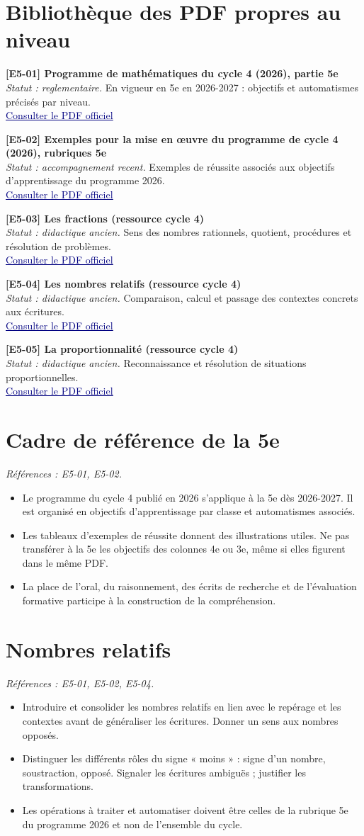 \documentclass[11pt,a4paper]{article}
\newcommand{\refsource}[1]{\textsf{\textcolor{slate}{[#1]}}}
\newcommand{\sectionref}[2]{\section{#1}\textit{Références : #2.}\par}
\newcommand{\entreesource}[5]{\par\noindent\textbf{\refsource{#1} #2}\\[-2pt]\textit{Statut : #3.} #4\\[-2pt]\href{#5}{\textcolor{navy}{\underline{Consulter le PDF officiel}}}\par\smallskip}
\begin{document}
\section{Bibliothèque des PDF propres au niveau}
\entreesource{E5-01}{Programme de mathématiques du cycle 4 (2026), partie 5e}{reglementaire}{En vigueur en 5e en 2026-2027 : objectifs et automatismes précisés par niveau.}{https://www.education.gouv.fr/sites/default/files/document/Annexe\%202\%20\%E2\%80\%93\%20Programme\%20de\%20math\%C3\%A9matiques\%20pour\%20le\%20cycle\%204-480716.pdf}
\entreesource{E5-02}{Exemples pour la mise en œuvre du programme de cycle 4 (2026), rubriques 5e}{accompagnement recent}{Exemples de réussite associés aux objectifs d’apprentissage du programme 2026.}{https://eduscol.education.gouv.fr/media/126080/download?attachment=}
\entreesource{E5-03}{Les fractions (ressource cycle 4)}{didactique ancien}{Sens des nombres rationnels, quotient, procédures et résolution de problèmes.}{https://eduscol.education.gouv.fr/sites/default/files/document/ra16c4mathfractionsdocmaitrecomp-calresoudre554225pdf-77607.pdf}
\entreesource{E5-04}{Les nombres relatifs (ressource cycle 4)}{didactique ancien}{Comparaison, calcul et passage des contextes concrets aux écritures.}{https://eduscol.education.gouv.fr/sites/default/files/document/ra16c4mathdocmaitrenombresrelatifscomparercalculerresoudrend552028pdf-77613.pdf}
\entreesource{E5-05}{La proportionnalité (ressource cycle 4)}{didactique ancien}{Reconnaissance et résolution de situations proportionnelles.}{https://eduscol.education.gouv.fr/sites/default/files/document/ra16c4mathresoupropo555092pdf-77649.pdf}
\sectionref{Cadre de référence de la 5e}{E5-01, E5-02}
\begin{itemize}
\item Le programme du cycle 4 publié en 2026 s’applique à la 5e dès 2026-2027. Il est organisé en objectifs d’apprentissage par classe et automatismes associés.
\item Les tableaux d’exemples de réussite donnent des illustrations utiles. Ne pas transférer à la 5e les objectifs des colonnes 4e ou 3e, même si elles figurent dans le même PDF.
\item La place de l’oral, du raisonnement, des écrits de recherche et de l’évaluation formative participe à la construction de la compréhension.
\end{itemize}
\sectionref{Nombres relatifs}{E5-01, E5-02, E5-04}
\begin{itemize}
\item Introduire et consolider les nombres relatifs en lien avec le repérage et les contextes avant de généraliser les écritures. Donner un sens aux nombres opposés.
\item Distinguer les différents rôles du signe « moins » : signe d’un nombre, soustraction, opposé. Signaler les écritures ambiguës ; justifier les transformations.
\item Les opérations à traiter et automatiser doivent être celles de la rubrique 5e du programme 2026 et non de l’ensemble du cycle.
\end{itemize}
\end{document}
